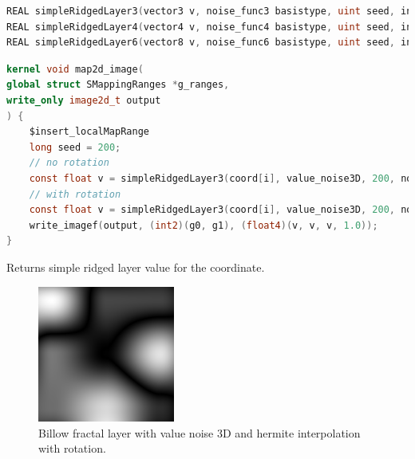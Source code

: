 \begin{lstlisting}[caption={Definition of ridged fractal layer functions},label={lst:ridged_fractal_layer_definition},language=OpenCL]
REAL simpleRidgedLayer3(vector3 v, noise_func3 basistype, uint seed, interp_func interp, REAL layerscale, REAL layerfreq, bool rot, REAL angle, REAL ax, REAL ay, REAL az);
REAL simpleRidgedLayer4(vector4 v, noise_func4 basistype, uint seed, interp_func interp, REAL layerscale, REAL layerfreq, bool rot, REAL angle, REAL ax, REAL ay, REAL az);
REAL simpleRidgedLayer6(vector8 v, noise_func6 basistype, uint seed, interp_func interp, REAL layerscale, REAL layerfreq, bool rot, REAL angle, REAL ax, REAL ay, REAL az);
\end{lstlisting}

\begin{lstlisting}[caption={Example for ridged fractal layer functions},label={lst:ridged_fractal_layer_example},language=OpenCL]
kernel void map2d_image(
global struct SMappingRanges *g_ranges,
write_only image2d_t output
) {
    $insert_localMapRange
    long seed = 200;
    // no rotation
    const float v = simpleRidgedLayer3(coord[i], value_noise3D, 200, noInterp, 1, 0.125, false, 0.0, 0.0, 0.0, 0.0);
    // with rotation
    const float v = simpleRidgedLayer3(coord[i], value_noise3D, 200, noInterp, 1, 0.125, true, 1.57, 1.0, 0.0, 0.0);
    write_imagef(output, (int2)(g0, g1), (float4)(v, v, v, 1.0));
}
\end{lstlisting}

Returns simple ridged layer value for the coordinate.

\begin{figure}[h]
\centering
\includegraphics[width=0.4\textwidth]{out/simpleBillowLayer3/simpleBillowLayer3_value_noise3D_hermiteInterp_rot.png}
\caption{Billow fractal layer with value noise 3D and hermite interpolation with rotation.}
\label{fig:billow_fractal_layer3_value_noise3D_hermiteInterp_rot}
\end{figure}

